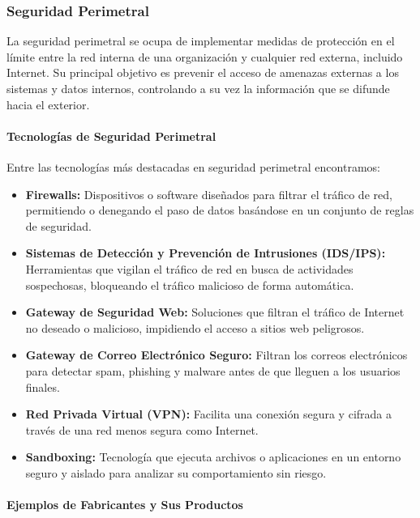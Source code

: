 \subsubsection{Seguridad Perimetral}

La seguridad perimetral se ocupa de implementar medidas de protección en el límite entre la red interna de una organización y cualquier red externa, incluido Internet. Su principal objetivo es prevenir el acceso de amenazas externas a los sistemas y datos internos, controlando a su vez la información que se difunde hacia el exterior.

\paragraph{Tecnologías de Seguridad Perimetral}

Entre las tecnologías más destacadas en seguridad perimetral encontramos:

\begin{itemize}
    \item \textbf{Firewalls:} Dispositivos o software diseñados para filtrar el tráfico de red, permitiendo o denegando el paso de datos basándose en un conjunto de reglas de seguridad.
    \item \textbf{Sistemas de Detección y Prevención de Intrusiones (IDS/IPS):} Herramientas que vigilan el tráfico de red en busca de actividades sospechosas, bloqueando el tráfico malicioso de forma automática.
    \item \textbf{Gateway de Seguridad Web:} Soluciones que filtran el tráfico de Internet no deseado o malicioso, impidiendo el acceso a sitios web peligrosos.
    \item \textbf{Gateway de Correo Electrónico Seguro:} Filtran los correos electrónicos para detectar spam, phishing y malware antes de que lleguen a los usuarios finales.
    \item \textbf{Red Privada Virtual (VPN):} Facilita una conexión segura y cifrada a través de una red menos segura como Internet.
    \item \textbf{Sandboxing:} Tecnología que ejecuta archivos o aplicaciones en un entorno seguro y aislado para analizar su comportamiento sin riesgo.
\end{itemize}

\paragraph{Ejemplos de Fabricantes y Sus Productos}

